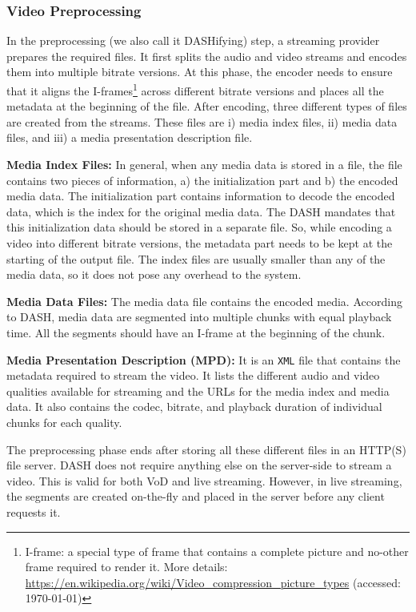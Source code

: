 \subsubsection{Video Preprocessing}
In the preprocessing (we also call it DASHifying) step, a streaming provider prepares the required files. It first splits the audio and video streams and encodes them into multiple bitrate versions. At this phase, the encoder needs to ensure that it aligns the I-frames\footnote{I-frame: a special type of frame that contains a complete picture and no-other frame required to render it. More details: \url{https://en.wikipedia.org/wiki/Video_compression_picture_types} (accessed: \today)} across different bitrate versions and places all the metadata at the beginning of the file. After encoding, three different types of files are created from the streams. These files are i) media index files, ii) media data files, and iii) a media presentation description file.

{\bf Media Index Files:} In general, when any media data is stored in a file, the file contains two pieces of information, a) the initialization part and b) the encoded media data. The initialization part contains information to decode the encoded data, which is the index for the original media data. The DASH mandates that this initialization data should be stored in a separate file. So, while encoding a video into different bitrate versions, the metadata part needs to be kept at the starting of the output file. The index files are usually smaller than any of the media data, so it does not pose any overhead to the system.

{\bf Media Data Files:} The media data file contains the encoded media. According to DASH, media data are segmented into multiple chunks with equal playback time. All the segments should have an I-frame at the beginning of the chunk.

{\bf Media Presentation Description (MPD):} It is an {\tt XML} file that contains the metadata required to stream the video. It lists the different audio and video qualities available for streaming and the URLs for the media index and media data. It also contains the codec, bitrate, and playback duration of individual chunks for each quality.

The preprocessing phase ends after storing all these different files in an HTTP(S) file server. DASH does not require anything else on the server-side to stream a video. This is valid for both VoD and live streaming. However, in live streaming, the segments are created on-the-fly and placed in the server before any client requests it.

